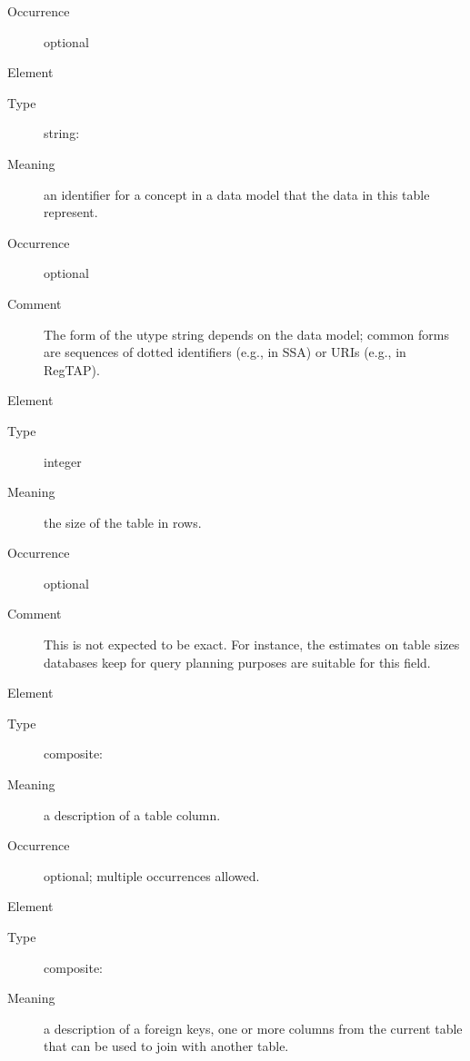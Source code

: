 \documentclass[11pt,a4paper]{ivoa}
\begin{document}
\begin{generated}
\begin{bigdescription}
\begin{description}
\item[Occurrence] optional

\end{description}
\item[Element \xmlel{utype}]
\begin{description}
\item[Type] string: 
\item[Meaning] 
                  an identifier for a concept in a data model that
                  the data in this table represent.  
               
\item[Occurrence] optional
\item[Comment] 
                  The form of the utype string depends on the data
                  model; common forms are sequences of dotted identifiers
                  (e.g., in SSA) or URIs (e.g., in RegTAP).
               

\end{description}
\item[Element \xmlel{nrows}]
\begin{description}
\item[Type] integer
\item[Meaning] 
                  the size of the table in rows.
               
\item[Occurrence] optional
\item[Comment] 
                  This is not expected to be exact.  For instance, the
                  estimates on table sizes databases keep for query
                  planning purposes are suitable for this field.
               

\end{description}
\item[Element \xmlel{column}]
\begin{description}
\item[Type] composite: 
\item[Meaning] 
                  a description of a table column.
               
\item[Occurrence] optional; multiple occurrences allowed.

\end{description}
\item[Element \xmlel{foreignKey}]
\begin{description}
\item[Type] composite: 
\item[Meaning] 
                  a description of a foreign keys, one or more columns
                  from the current table that can be used to join with 
                  another table.  
               

\end{description}
\end{bigdescription}
\end{generated}
\end{document}
